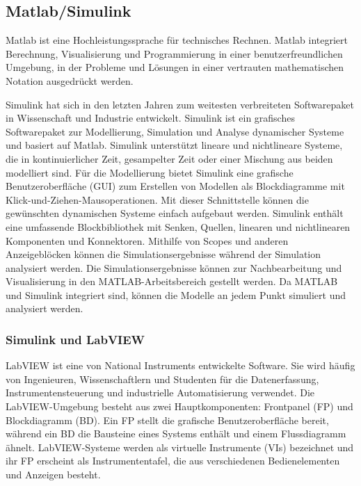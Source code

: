 %
%
%
%
\subsection{Matlab/Simulink}

Matlab ist eine Hochleistungssprache für technisches Rechnen. Matlab integriert Berechnung, Visualisierung und Programmierung in einer benutzerfreundlichen Umgebung, in der Probleme und Lösungen in einer vertrauten mathematischen Notation ausgedrückt werden.

Simulink hat sich in den letzten Jahren zum weitesten verbreiteten Softwarepaket in Wissenschaft und Industrie entwickelt.
Simulink ist ein grafisches Softwarepaket zur Modellierung, Simulation und Analyse dynamischer Systeme und basiert auf Matlab. Simulink unterstützt lineare und nichtlineare Systeme, die in kontinuierlicher Zeit, gesampelter Zeit oder einer Mischung aus beiden modelliert sind. Für die Modellierung bietet Simulink eine grafische Benutzeroberfläche (GUI) zum Erstellen von Modellen als Blockdiagramme mit Klick-und-Ziehen-Mausoperationen. Mit dieser Schnittstelle können die gewünschten dynamischen Systeme einfach aufgebaut werden. Simulink enthält eine umfassende Blockbibliothek mit Senken, Quellen, linearen und nichtlinearen Komponenten und Konnektoren. Mithilfe von Scopes und anderen Anzeigeblöcken können die Simulationsergebnisse während der Simulation analysiert werden. Die Simulationsergebnisse können zur Nachbearbeitung und Visualisierung in den MATLAB-Arbeitsbereich gestellt werden. Da MATLAB und Simulink integriert sind, können die Modelle an jedem Punkt simuliert und analysiert werden. \cite{Iov2004}\cite{Karris2008}\\



\subsubsection{Simulink und LabVIEW} 
LabVIEW ist eine von National Instruments entwickelte Software. Sie wird häufig von Ingenieuren, Wissenschaftlern und Studenten für die Datenerfassung, Instrumentensteuerung und industrielle Automatisierung verwendet. Die LabVIEW-Umgebung besteht aus zwei Hauptkomponenten: Frontpanel (FP) und Blockdiagramm (BD). Ein FP stellt die grafische Benutzeroberfläche bereit, während ein BD die Bausteine eines Systems enthält und einem Flussdiagramm ähnelt. LabVIEW-Systeme werden als virtuelle Instrumente (VIs) bezeichnet und ihr FP erscheint als Instrumententafel, die aus verschiedenen Bedienelementen und Anzeigen besteht.

